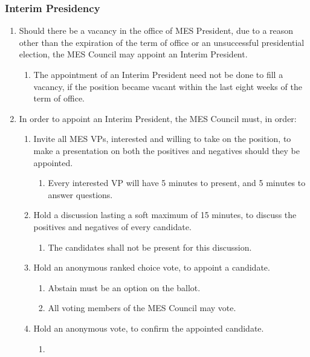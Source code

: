 \subsubsection{Interim Presidency}
\label{interim-presidency}

\begin{enumerate}
 \item
  Should there be a vacancy in the office of MES President, due to a reason
  other than the expiration of the term of office or an unsuccessful
  presidential election, the MES Council may appoint an Interim President.
  \begin{enumerate}
   \item
    The appointment of an Interim President need not be done to fill a vacancy, if the position became vacant within the last eight weeks of the term of office.  \end{enumerate}
   \item
    In order to appoint an Interim President, the MES Council must, in order:
  \begin{enumerate}
   \item
    Invite all MES VPs, interested and willing to take on the position, to make a presentation on both the positives and negatives should they be appointed. 
    \begin{enumerate}
     \item 
      Every interested VP will have 5 minutes to present, and 5 minutes to answer questions.
    \end{enumerate}
   \item
    Hold a discussion lasting a soft maximum of 15 minutes, to discuss the positives and negatives of every candidate.
    \begin{enumerate}
     \item 
      The candidates shall not be present for this discussion.
    \end{enumerate}
   \item
    Hold an anonymous ranked choice vote, to appoint a candidate.
    \begin{enumerate}
     \item 
      Abstain must be an option on the ballot.
     \item 
      All voting members of the MES Council may vote.
    \end{enumerate}
   \item 
    Hold an anonymous vote, to confirm the appointed candidate.
    \begin{enumerate}
     \item 

\end{enumerate}
\end{enumerate}
\end{enumerate}
